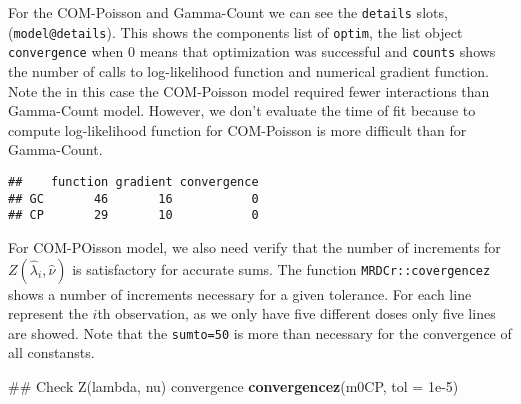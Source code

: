 \documentclass[9pt,a5paper,]{book}
\newenvironment{Shaded}{}{}
\newcommand{\KeywordTok}[1]{\textbf{{#1}}}
\newcommand{\DataTypeTok}[1]{\underline{{#1}}}
\newcommand{\FloatTok}[1]{{#1}}
\newcommand{\StringTok}[1]{{#1}}
\newcommand{\NormalTok}[1]{{#1}}
\renewenvironment{Shaded}{\color{inputcolor}}{}
\renewcommand{\DataTypeTok}[1]{{#1}}
\theoremstyle{definition}
\theoremstyle{definition}
\theoremstyle{remark}
\begin{document}
For the COM-Poisson and Gamma-Count we can see the \texttt{details}
slots, (\texttt{model@details}). This shows the components list of
\texttt{optim}, the list object \texttt{convergence} when 0 means that
optimization was successful and \texttt{counts} shows the number of
calls to log-likelihood function and numerical gradient function. Note
the in this case the COM-Poisson model required fewer interactions than
Gamma-Count model. However, we don't evaluate the time of fit because to
compute log-likelihood function for COM-Poisson is more difficult than
for Gamma-Count.

\begin{Shaded}
\end{Shaded}

\begin{verbatim}
##    function gradient convergence
## GC       46       16           0
## CP       29       10           0
\end{verbatim}

For COM-POisson model, we also need verify that the number of increments
for \(Z(\hat{\lambda}_i, \hat{\nu})\) is satisfactory for accurate sums.
The function \texttt{MRDCr::covergencez} shows a number of increments
necessary for a given tolerance. For each line represent the \(i\)th
observation, as we only have five different doses only five lines are
showed. Note that the \texttt{sumto=50} is more than necessary for the
convergence of all constansts.

\begin{Shaded}
\begin{Highlighting}[]
\NormalTok{## Check Z(lambda, nu) convergence}
\KeywordTok{convergencez}\NormalTok{(m0CP, }\DataTypeTok{tol =} \FloatTok{1e-5}\NormalTok{)}
\end{Highlighting}
\end{Shaded}
\end{document}
